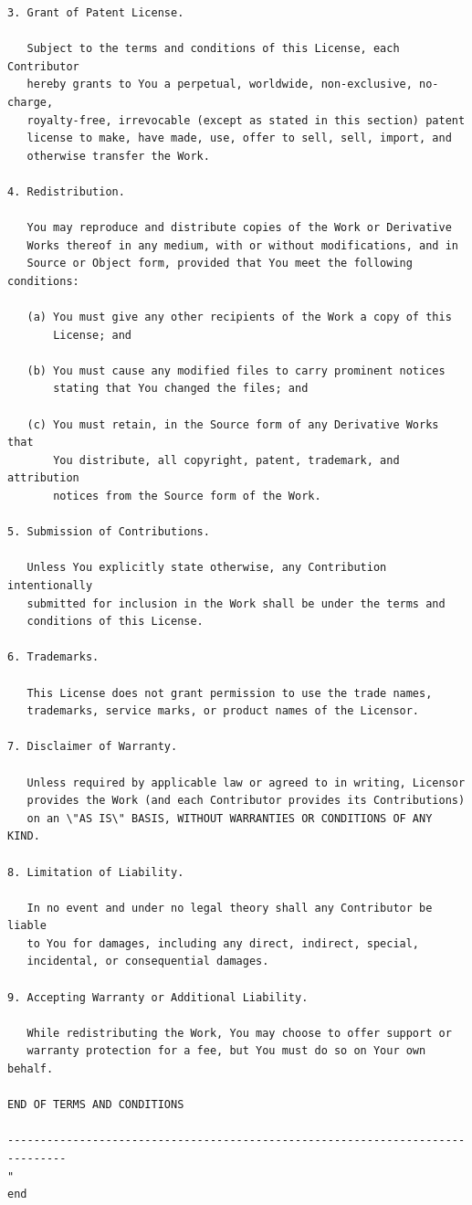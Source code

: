 \documentclass[12pt,a4paper]{article}
\begin{document}
\begin{verbatim}
3. Grant of Patent License.

   Subject to the terms and conditions of this License, each Contributor
   hereby grants to You a perpetual, worldwide, non-exclusive, no-charge,
   royalty-free, irrevocable (except as stated in this section) patent
   license to make, have made, use, offer to sell, sell, import, and
   otherwise transfer the Work.

4. Redistribution.

   You may reproduce and distribute copies of the Work or Derivative
   Works thereof in any medium, with or without modifications, and in
   Source or Object form, provided that You meet the following conditions:

   (a) You must give any other recipients of the Work a copy of this
       License; and

   (b) You must cause any modified files to carry prominent notices
       stating that You changed the files; and

   (c) You must retain, in the Source form of any Derivative Works that
       You distribute, all copyright, patent, trademark, and attribution
       notices from the Source form of the Work.

5. Submission of Contributions.

   Unless You explicitly state otherwise, any Contribution intentionally
   submitted for inclusion in the Work shall be under the terms and
   conditions of this License.

6. Trademarks.

   This License does not grant permission to use the trade names,
   trademarks, service marks, or product names of the Licensor.

7. Disclaimer of Warranty.

   Unless required by applicable law or agreed to in writing, Licensor
   provides the Work (and each Contributor provides its Contributions)
   on an \"AS IS\" BASIS, WITHOUT WARRANTIES OR CONDITIONS OF ANY KIND.

8. Limitation of Liability.

   In no event and under no legal theory shall any Contributor be liable
   to You for damages, including any direct, indirect, special,
   incidental, or consequential damages.

9. Accepting Warranty or Additional Liability.

   While redistributing the Work, You may choose to offer support or
   warranty protection for a fee, but You must do so on Your own behalf.

END OF TERMS AND CONDITIONS

-------------------------------------------------------------------------------
"
end
\end{verbatim}
\end{document}
